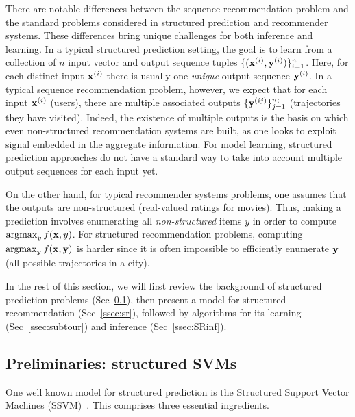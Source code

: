 There are notable differences between the sequence recommendation problem and %
the standard problems considered in structured prediction and recommender systems.
These differences bring unique challenges for both inference and learning.
In a typical structured prediction setting, the goal is to learn from a collection of $n$
input vector and output sequence tuples %
$\{ (\mathbf{x}^{({i})}, \mathbf{y}^{({i})}) \}_{i = 1}^n$. Here,
for each distinct input $\mathbf{x}^{({i})}$ there is usually one \emph{unique} output sequence $\mathbf{y}^{({i})}$.
In a typical sequence recommendation problem, however, we expect that %
for each input $\mathbf{x}^{({i})}$ (\eg users),
there %
are multiple associated outputs %
$\{ \mathbf{y}^{({ij})} \}_{j=1}^{n_i}$ (\eg trajectories they have visited).
Indeed, the existence of multiple outputs is the basis on which even non-structured recommendation systems are built, as one looks to exploit signal embedded in the aggregate information.
For model learning, structured prediction approaches do not have a standard way to take into account multiple output sequences 
for each input %
yet.

On the other hand, for typical recommender systems problems, one assumes that the outputs are non-structured (\eg real-valued ratings for movies).
Thus, making a prediction involves enumerating all {\em non-structured} items $y$ in order to compute $\operatorname*{argmax}_y f(\mathbf{x},y)$.
For structured recommendation problems, computing $\operatorname*{argmax}_{\mathbf{y}} f(\mathbf{x},\mathbf{y})$ is harder since it is often impossible to efficiently enumerate $\mathbf{y}$ (\eg all possible trajectories in a city).

In the rest of this section, we will first review the background of structured prediction problems (Sec~\ref{ssec:ssvm}), then present a model for structured recommendation (Sec~\ref{ssec:sr}), followed by algorithms for its learning (Sec~\ref{ssec:subtour}) and inference (Sec~\ref{ssec:SRinf}).


\secmoveup
\subsection{Preliminaries: structured SVMs}
\label{ssec:ssvm}
\textmoveup

One well known model for structured prediction is the Structured Support Vector Machines (SSVM)~\cite{joachims2009predicting,tsochantaridis2005large}.
This comprises three essential ingredients.

